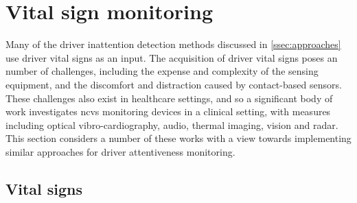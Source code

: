 \documentclass[11pt, parskip=half*,twoside=false]{scrbook}
\begin{document}
%
% 


\section{Vital sign monitoring} \label{sec:vital_sign}
%

Many of the driver inattention detection methods discussed in \cref{ssec:approaches} use driver vital signs as an input. The acquisition of driver vital signs poses an number of challenges, including the expense and complexity of the sensing equipment, and the discomfort and distraction caused by contact-based sensors. These challenges also exist in healthcare settings, and so a significant body of work investigates \gls{ncvs} monitoring devices in a clinical setting, with measures including optical vibro-cardiography, audio, thermal imaging, vision and radar. This section considers a number of these works with a view towards implementing similar approaches for driver attentiveness monitoring.

\subsection{Vital signs} \label{ssec:vital_signs}
%
%
\end{document}
